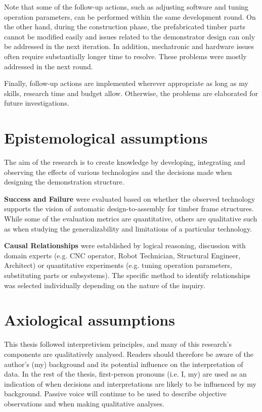Note that some of the follow-up actions, such as adjusting software and tuning operation parameters, can be performed within the same development round. On the other hand, during the construction phase, the prefabricated timber parts cannot be modified easily and issues related to the demonstrator design can only be addressed in the next iteration. In addition, mechatronic and hardware issues often require substantially longer time to resolve. These problems were mostly addressed in the next round. 

Finally, follow-up actions are implemented wherever appropriate as long as my skills, research time and budget allow. Otherwise, the problems are elaborated for future investigations. 

\section{Epistemological assumptions}

The aim of the research is to create knowledge by developing, integrating and observing the effects of various technologies and the decisions made when designing the demonstration structure.

\textbf{Success and Failure} were evaluated based on whether the observed technology supports the vision of automatic design-to-assembly for timber frame structures. While some of the evaluation metrics are quantitative, others are qualitative such as when studying the generalizability and limitations of a particular technology.

\textbf{Causal Relationships} were established by logical reasoning, discussion with domain experts (e.g. CNC operator, Robot Technician, Structural Engineer, Architect) or quantitative experiments (e.g. tuning operation parameters, substituting parts or subsystems). The specific method to identify relationships was selected individually depending on the nature of the inquiry.

\section{Axiological assumptions}

This thesis followed interpretivism principles, and many of this research's components are qualitatively analysed. Readers should therefore be aware of the author’s (my) background and its potential influence on the interpretation of data. In the rest of the thesis, first-person pronouns (i.e. I, my) are used as an indication of when decisions and interpretations are likely to be influenced by my background. Passive voice will continue to be used to describe objective observations and when making qualitative analyses.

